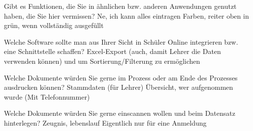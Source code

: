 Gibt es Funktionen, die Sie in ähnlichen bzw. anderen Anwendungen genutzt haben, die Sie hier vermissen?
Ne, ich kann alles eintragen
Farben, reiter oben in grün, wenn vollständig ausgefüllt			





Welche Software sollte man aus Ihrer Sicht in Schüler Online integrieren bzw. eine Schnittstelle schaffen? 
Excel-Export (auch, damit Lehrer die Daten verwenden können) und um Sortierung/Filterung zu ermöglichen




Welche Dokumente würden Sie gerne im Prozess oder am Ende des Prozesses ausdrucken können?		
Stammdaten (für Lehrer)
Übersicht, wer aufgenommen wurde (Mit Telefonnummer)

Welche Dokumente würden Sie gerne einscannen wollen und beim Datensatz hinterlegen?		
Zeugnis, lebenslauf
Eigentlich nur für eine Anmeldung				
